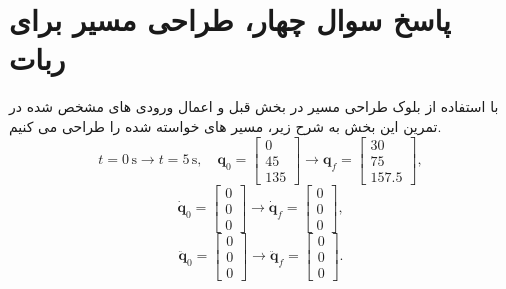 \section*{ پاسخ سوال چهار، طراحی مسیر برای ربات}
با استفاده از بلوک طراحی مسیر در بخش قبل و اعمال ورودی های مشخص شده در تمرین این بخش به شرح زیر، مسیر های خواسته شده را طراحی می کنیم.
\[
t = 0 \, \text{s} \rightarrow t = 5 \, \text{s}, \quad 
\mathbf{q}_0 = \begin{bmatrix} 0 \\ 45 \\ 135 \end{bmatrix} 
\rightarrow \mathbf{q}_f = \begin{bmatrix} 30 \\ 75 \\ 157.5 \end{bmatrix},
\]
\[
\dot{\mathbf{q}}_0 = \begin{bmatrix} 0 \\ 0 \\ 0 \end{bmatrix} 
\rightarrow \dot{\mathbf{q}}_f = \begin{bmatrix} 0 \\ 0 \\ 0 \end{bmatrix},
\]
\[
\ddot{\mathbf{q}}_0 = \begin{bmatrix} 0 \\ 0 \\ 0 \end{bmatrix} 
\rightarrow \ddot{\mathbf{q}}_f = \begin{bmatrix} 0 \\ 0 \\ 0 \end{bmatrix}.
\]

